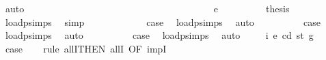\begin{isabellebody}
\ auto\isanewline
\ \ \ \ \ \ \ \ \ \ \isamarkupfalse%
\isanewline
\ \ \ \ \ \ \ \ \isamarkupfalse%
\isanewline
\ \ \ \ \ \ \isamarkupfalse%
\isanewline
\ \ \ \ \isamarkupfalse%
\isanewline
\ \ \isamarkupfalse%
\isanewline
\ \ \ \ \isamarkupfalse%
\ {\isacharparenleft}{\kern0pt}e\ {\isacharunderscore}{\kern0pt}{\isacharparenright}{\kern0pt}\isanewline
\ \ \ \ \isamarkupfalse%
\ {}{}{\isacharparenleft}{\kern0pt}{}{\isacharparenright}{\kern0pt}\ \isamarkupfalse%
\ {\isacharquery}{\kern0pt}thesis\ \isamarkupfalse%
\ load{\isachardot}{\kern0pt}psimps{\isacharparenleft}{\kern0pt}{}{\isacharparenright}{\kern0pt}\ \isamarkupfalse%
\ simp\isanewline
\ \ \isamarkupfalse%
\isanewline
{}\isamarkupfalse%
\isanewline
\ \ \isamarkupfalse%
\ {}{}\isanewline
\ \ \isamarkupfalse%
\ \isamarkupfalse%
\ {\isacharquery}{\kern0pt}case\ \isamarkupfalse%
\ load{\isachardot}{\kern0pt}psimps{\isacharparenleft}{\kern0pt}{}{\isacharparenright}{\kern0pt}\ \isamarkupfalse%
\ auto\isanewline
{}\isamarkupfalse%
\isanewline
\ \ \isamarkupfalse%
\ {}{}\isanewline
\ \ \isamarkupfalse%
\ \isamarkupfalse%
\ {\isacharquery}{\kern0pt}case\ \isamarkupfalse%
\ load{\isachardot}{\kern0pt}psimps{\isacharparenleft}{\kern0pt}{}{\isacharparenright}{\kern0pt}\ \isamarkupfalse%
\ auto\isanewline
{}\isamarkupfalse%
\isanewline
\ \ \isamarkupfalse%
\ {}{}\isanewline
\ \ \isamarkupfalse%
\ \isamarkupfalse%
\ {\isacharquery}{\kern0pt}case\ \isamarkupfalse%
\ load{\isachardot}{\kern0pt}psimps{\isacharparenleft}{\kern0pt}{}{\isacharparenright}{\kern0pt}\ \isamarkupfalse%
\ auto\isanewline
{}\isamarkupfalse%
\isanewline
\ \ \isamarkupfalse%
\ {\isacharparenleft}{\kern0pt}{}{}\ i\ e\ cd\ st\ g{\isacharparenright}{\kern0pt}\isanewline
\ \ \isamarkupfalse%
\ {\isacharquery}{\kern0pt}case\isanewline
\ \ \isamarkupfalse%
\ {\isacharparenleft}{\kern0pt}rule\ allI{\isacharbrackleft}{\kern0pt}THEN\ allI{\isacharcomma}{\kern0pt}\ OF\ impI{\isacharbrackright}{\kern0pt}{\isacharparenright}{\kern0pt}\isanewline

\end{isabellebody}
